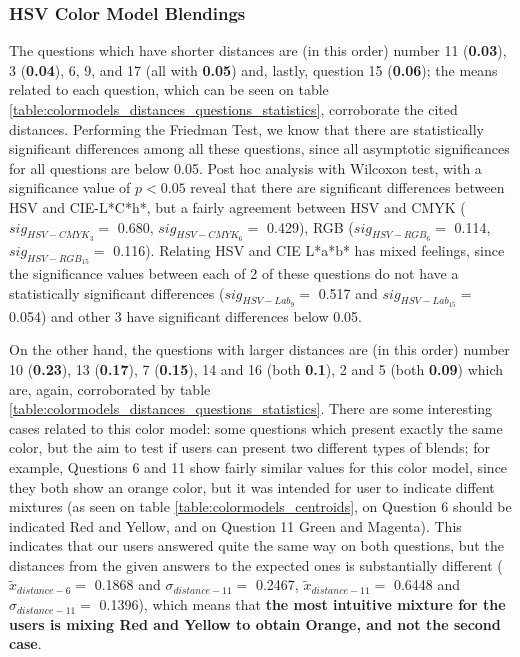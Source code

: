 \subsubsection{HSV Color Model Blendings}
\label{subsubsec:hsvcolormodel}
%
The questions which have shorter distances are (in this order) number 11 (\textbf{0.03}), 3 (\textbf{0.04}), 6, 9, and 17 (all with \textbf{0.05}) and, lastly, question 15 (\textbf{0.06}); the means related to each question, which can be
seen on table \ref{table:colormodels_distances_questions_statistics}, corroborate the cited distances. Performing the Friedman Test, we know that there are statistically significant differences among all these questions, since all asymptotic
significances for all questions are below 0.05. Post hoc analysis with Wilcoxon test, with a significance value of $p < 0.05$ reveal that there are significant differences between HSV and CIE-L*C*h*, but a fairly agreement between HSV and CMYK
($sig_{HSV-CMYK_3} = $ 0.680, $sig_{HSV-CMYK_6} = $ 0.429), RGB ($sig_{HSV-RGB_6} = $ 0.114, $sig_{HSV-RGB_15} = $ 0.116). Relating HSV and CIE L*a*b* has mixed feelings, since the significance values between each of 2
of these questions do not have a statistically significant differences ($sig_{HSV-Lab_9} = $ 0.517 and $sig_{HSV-Lab_15} = $ 0.054) and other 3 have significant differences below 0.05. \par
%
On the other hand, the questions with larger distances are (in this order) number 10 (\textbf{0.23}), 13 (\textbf{0.17}), 7 (\textbf{0.15}), 14 and 16 (both \textbf{0.1}), 2 and
5 (both \textbf{0.09}) which are, again, corroborated by table \ref{table:colormodels_distances_questions_statistics}. There are some interesting cases related to this color model: some questions which present exactly the same color, but the aim to test if users can present
two different types of blends; for example, Questions 6 and 11 show fairly similar values for this color model, since they both show an orange color, but it was intended for user to indicate diffent mixtures (as seen on table \ref{table:colormodels_centroids}, on Question 6 should be
indicated Red and Yellow, and on Question 11 Green and Magenta). This indicates that our users answered quite the same way on both questions, but the distances from the given answers to the expected ones is substantially different ($\tilde{x}_{distance-6} = $ 0.1868 and
$\sigma_{distance-11} = $ 0.2467, $\tilde{x}_{distance-11} = $ 0.6448 and $\sigma_{distance-11} = $ 0.1396), which means that \textbf{the most intuitive mixture for the users is mixing Red and Yellow to obtain Orange, and not the second case}. \par
